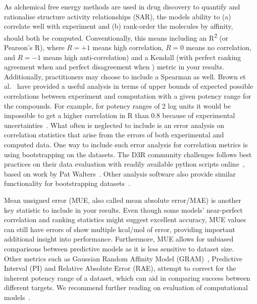 \documentclass[9pt,bestpractices]{livecoms}
\begin{document}
As alchemical free energy methods are used in drug discovery to quantify and rationalise structure activity relationships (SAR), the models ability to (a) correlate well with experiment and (b) rank-order the molecules by affinity, should both be computed. Conventionally, this means including an R\textsuperscript{2} (or Pearson's R), where $R=+1$ means high correlation, $R=0$ means no correlation, and $R=-1$ means high anti-correlation) and a Kendall \texttau{} (with perfect ranking agreement when  and perfect disagreement when ) metric in your results. Additionally, practitioners may choose to include a Spearman \textrho{} as well. Brown et al.~\cite{brown2009healthy} have provided a useful analysis in terms of upper bounds of expected possible correlations between experiment and computation with a given potency range for the compounds. For example, for potency ranges of 2 log units it would be impossible to get a higher correlation in R than 0.8 because of experimental uncertainties~\cite{brown2009healthy}. What often is neglected to include is an error analysis on correlation statistics that arise from the errors of both experimental and computed data. One way to include such error analysis for correlation metrics is using bootstrapping on the datasets. The D3R community challenges follows best practices on their data evaluation with readily available python scripts online~\cite{2018drugdata}, based on work by Pat Walters~\cite{walters2013what}. Other analysis software also provide similar functionality for bootstrapping datasets~\cite{antonia2019michellab}. 

Mean unsigned error (MUE, also called mean absolute error/MAE) is another key statistic to include in your results. Even though some models' near-perfect correlation and ranking statistics might suggest excellent accuracy, MUE values can still have errors of show multiple kcal/mol of error, providing important additional insight into performance. Furthermore, MUE allows for unbiased comparisons between predictive models as it is less sensitive to dataset size. Other metrics such as Gaussian Random Affinity Model (GRAM)~\cite{cui2020gram}, Predictive Interval (PI) and Relative Absolute Error (RAE), attempt to correct for the inherent potency range of a dataset, which can aid in comparing success between different targets. We recommend further reading on evaluation of computational models~\cite{jain2008recommendations, walters2013what, brown2009healthy, walterthoughts}.
\end{document}
